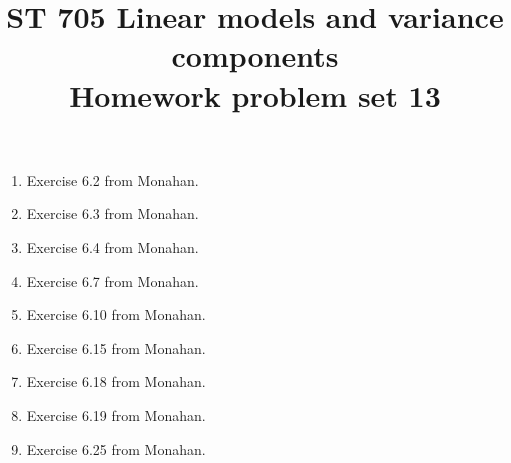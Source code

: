 \documentclass[11pt]{article}
\title{ST 705 Linear models and variance components \\ 
        Homework problem set 13}
\begin{document}
\maketitle

\begin{enumerate}

\item Exercise 6.2 from Monahan.

\item Exercise 6.3 from Monahan.

\item Exercise 6.4 from Monahan.

\item Exercise 6.7 from Monahan.

\item Exercise 6.10 from Monahan.

\item Exercise 6.15 from Monahan.

\item Exercise 6.18 from Monahan.

\item Exercise 6.19 from Monahan.

\item Exercise 6.25 from Monahan.






\end{enumerate}
\end{document}
